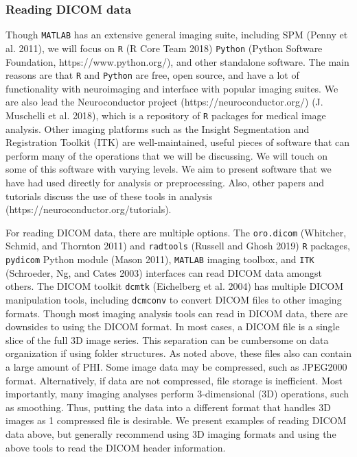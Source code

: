 \documentclass[]{elsarticle} %
\begin{document}
\hypertarget{reading-dicom-data}{%
\subsubsection{Reading DICOM data}\label{reading-dicom-data}}

Though \texttt{MATLAB} has an extensive general imaging suite, including SPM (Penny et al. 2011), we will focus on \texttt{R} (R Core Team 2018) \texttt{Python} (Python Software Foundation, https://www.python.org/), and other standalone software. The main reasons are that \texttt{R} and \texttt{Python} are free, open source, and have a lot of functionality with neuroimaging and interface with popular imaging suites. We are also lead the Neuroconductor project (https://neuroconductor.org/) (J. Muschelli et al. 2018), which is a repository of \texttt{R} packages for medical image analysis. Other imaging platforms such as the Insight Segmentation and Registration Toolkit (ITK) are well-maintained, useful pieces of software that can perform many of the operations that we will be discussing. We will touch on some of this software with varying levels. We aim to present software that we have had used directly for analysis or preprocessing. Also, other papers and tutorials discuss the use of these tools in analysis (https://neuroconductor.org/tutorials).

For reading DICOM data, there are multiple options. The \texttt{oro.dicom} (Whitcher, Schmid, and Thornton 2011) and \texttt{radtools} (Russell and Ghosh 2019) \texttt{R} packages, \texttt{pydicom} Python module (Mason 2011), \texttt{MATLAB} imaging toolbox, and \texttt{ITK} (Schroeder, Ng, and Cates 2003) interfaces can read DICOM data amongst others. The DICOM toolkit \texttt{dcmtk} (Eichelberg et al. 2004) has multiple DICOM manipulation tools, including \texttt{dcmconv} to convert DICOM files to other imaging formats. Though most imaging analysis tools can read in DICOM data, there are downsides to using the DICOM format. In most cases, a DICOM file is a single slice of the full 3D image series. This separation can be cumbersome on data organization if using folder structures. As noted above, these files also can contain a large amount of PHI. Some image data may be compressed, such as JPEG2000 format. Alternatively, if data are not compressed, file storage is inefficient. Most importantly, many imaging analyses perform 3-dimensional (3D) operations, such as smoothing. Thus, putting the data into a different format that handles 3D images as 1 compressed file is desirable. We present examples of reading DICOM data above, but generally recommend using 3D imaging formats and using the above tools to read the DICOM header information.
\end{document}
